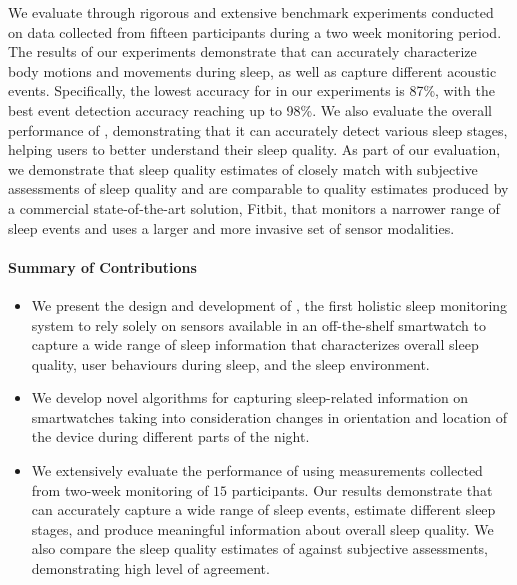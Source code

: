   
We evaluate \systemname through rigorous and extensive benchmark experiments conducted on data collected from fifteen participants during a two week monitoring period. The results of our experiments demonstrate that \systemname can accurately characterize body motions and movements during sleep, as well as capture different acoustic events. Specifically, the lowest accuracy for \systemname in our experiments is 87\%, with the best event detection accuracy reaching up to 98\%. We also evaluate the overall performance of \systemname, demonstrating that it can accurately detect various sleep stages, helping users to better understand their sleep quality. As part of our evaluation, we demonstrate that sleep quality estimates of \systemname closely match with subjective assessments of sleep quality and are comparable to quality estimates produced by a commercial state-of-the-art solution, Fitbit, that monitors a narrower range of sleep events and uses a larger and more invasive set of sensor modalities.  

\noindent \paragraph{Summary of Contributions} 

\begin{itemize}[noitemsep]
	\item We present the design and development of \systemname, the first holistic sleep monitoring system to rely solely on sensors available in an off-the-shelf smartwatch to capture a wide range of sleep information that characterizes overall sleep quality, user behaviours during sleep, and the sleep environment.  
	\item We develop novel algorithms for capturing sleep-related information on smartwatches taking into consideration changes in orientation and location of the device during different parts of the night.
	\item We extensively evaluate the performance of \systemname using measurements collected from two-week monitoring of $15$ participants. Our results demonstrate that \systemname can accurately capture a wide range of sleep events, estimate different sleep stages, and produce meaningful information about overall sleep quality. We also compare the sleep quality estimates of \systemname against subjective assessments, demonstrating high level of agreement. 
\end{itemize}

